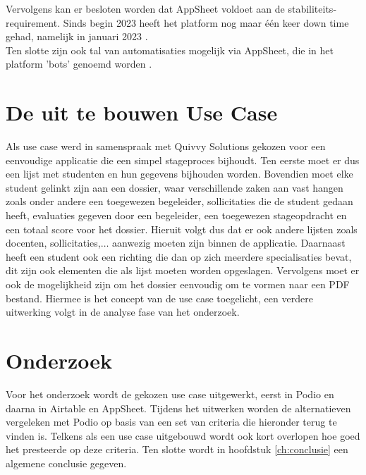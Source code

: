 Vervolgens kan er besloten worden dat AppSheet voldoet aan de stabiliteits-requirement. Sinds begin 2023 heeft het platform nog maar één keer down time gehad, namelijk in januari 2023 \autocite{AppSheetStatus}. \\

Ten slotte zijn ook tal van automatisaties mogelijk via AppSheet, die in het platform 'bots' genoemd worden \autocite{Wong2021}. \\


\section{De uit te bouwen Use Case}

Als use case werd in samenspraak met Quivvy Solutions gekozen voor een eenvoudige applicatie die een simpel stageproces bijhoudt. Ten eerste moet er dus een lijst met studenten en hun gegevens bijhouden worden. Bovendien moet elke student gelinkt zijn aan een dossier, waar verschillende zaken aan vast hangen zoals onder andere een toegewezen begeleider, sollicitaties die de student gedaan heeft, evaluaties gegeven door een begeleider, een toegewezen stageopdracht en een totaal score voor het dossier. Hieruit volgt dus dat er ook andere lijsten zoals docenten, sollicitaties,$\ldots$ aanwezig moeten zijn binnen de applicatie. Daarnaast heeft een student ook een richting die dan op zich meerdere specialisaties bevat, dit zijn ook elementen die als lijst moeten worden opgeslagen. Vervolgens moet er ook de mogelijkheid zijn om het dossier eenvoudig om te vormen naar een PDF bestand. Hiermee is het concept van de use case toegelicht, een verdere uitwerking volgt in de analyse fase van het onderzoek. \\

\section{Onderzoek} 

Voor het onderzoek wordt de gekozen use case uitgewerkt, eerst in Podio en daarna in Airtable en AppSheet. Tijdens het uitwerken worden de alternatieven vergeleken met Podio op basis van een set van criteria die hieronder terug te vinden is. Telkens als een use case uitgebouwd wordt ook kort overlopen hoe goed het presteerde op deze criteria. Ten slotte wordt in hoofdstuk \ref{ch:conclusie} een algemene conclusie gegeven. \\

